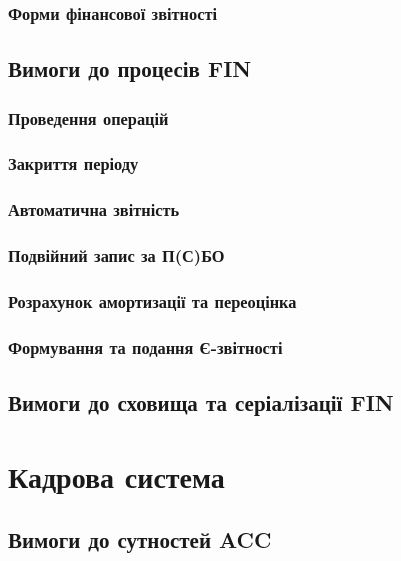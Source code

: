 \subsubsection{Форми фінансової звітності}

\subsection{Вимоги до процесів FIN}

\subsubsection{Проведення операцій}

\subsubsection{Закриття періоду}

\subsubsection{Автоматична звітність}

\subsubsection{Подвійний запис за П(С)БО}

\subsubsection{Розрахунок амортизації та переоцінка}

\subsubsection{Формування та подання Є-звітності}

\subsection{Вимоги до сховища та серіалізації FIN}

\newpage
\section{Кадрова система}

\subsection{Вимоги до сутностей ACC}

